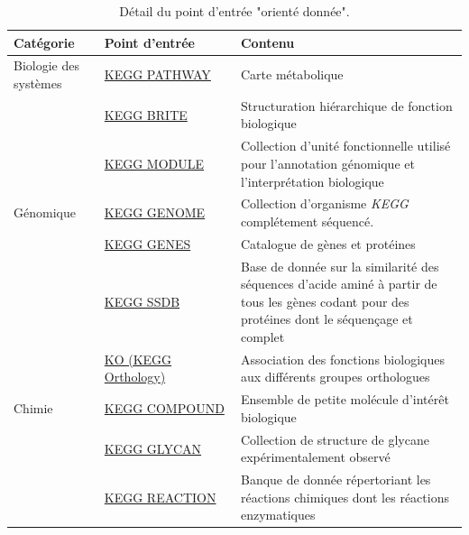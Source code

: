 \begin{refsegment}
    
    \begin{table}
        \small
        \caption{Détail du point d'entrée "orienté donnée". }\label{tab:kegg_data_oriented}
        \label{tab:kegg_oriented_data} 
        \begin{tabular}{p{0.2\linewidth}|p{0.3\linewidth}|p{0.5\linewidth}}
            \toprule
            Catégorie               & Point d'entrée                                                        & Contenu \\
            \midrule
            Biologie des systèmes  & \href{http://www.genome.jp/kegg/pathway.html}{KEGG PATHWAY}           & Carte métabolique \\   
            \cline{2-3}
                                    & \href{http://www.genome.jp/kegg/brite.html}{KEGG BRITE}               & Structuration hiérarchique de fonction biologique \\
            \cline{2-3}             & \href{http://www.genome.jp/kegg/module.html}{KEGG MODULE}             & Collection d'unité fonctionnelle utilisé pour l'annotation génomique et l'interprétation biologique \\
            \hline
            Génomique               & \href{http://www.genome.jp/kegg/genome.html}{KEGG GENOME}             & Collection d'organisme \textit{KEGG} complétement séquencé. \\
            \cline{2-3}             & \href{http://www.genome.jp/kegg/genes.html}{KEGG GENES}               & Catalogue de gènes et protéines \\
            \cline{2-3}             & \href{http://www.kegg.jp/kegg/ssdb/}{KEGG SSDB}                       & Base de donnée sur la similarité des séquences d'acide aminé à partir de tous les gènes codant pour des protéines dont le séquençage et complet \\
            \cline{2-3}             & \href{http://www.genome.jp/kegg/ko.html}{KO (KEGG Orthology)}         & Association des fonctions biologiques aux différents groupes orthologues  \\
            \hline
            Chimie                  & \href{http://www.genome.jp/kegg/compound/}{KEGG COMPOUND}             & Ensemble de petite molécule d'intérêt biologique\\
            \cline{2-3}             & \href{http://www.genome.jp/kegg/glycan/}{KEGG GLYCAN}                 & Collection de structure de glycane expérimentalement observé \\
            \cline{2-3}             & \href{http://www.genome.jp/kegg/reaction/}{KEGG REACTION}             & Banque de donnée répertoriant les réactions chimiques dont les réactions enzymatiques\\

\end{tabular}
\end{table}
\end{refsegment}
